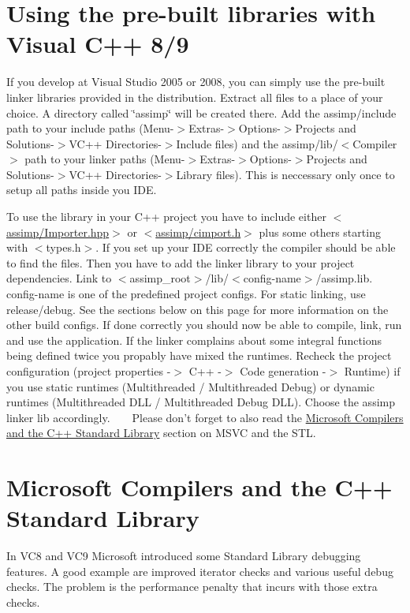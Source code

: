 \hypertarget{install_install_prebuilt}{}\section{Using the pre-\/built libraries with Visual C++ 8/9}\label{install_install_prebuilt}
If you develop at Visual Studio 2005 or 2008, you can simply use the pre-\/built linker libraries provided in the distribution. Extract all files to a place of your choice. A directory called \char`\"{}assimp\char`\"{} will be created there. Add the assimp/include path to your include paths (Menu-\/$>$Extras-\/$>$Options-\/$>$Projects and Solutions-\/$>$V\+C++ Directories-\/$>$Include files) and the assimp/lib/$<$Compiler$>$ path to your linker paths (Menu-\/$>$Extras-\/$>$Options-\/$>$Projects and Solutions-\/$>$V\+C++ Directories-\/$>$Library files). This is neccessary only once to setup all paths inside you I\+D\+E.

To use the library in your C++ project you have to include either $<$\hyperlink{_importer_8hpp_source}{assimp/\+Importer.\+hpp}$>$ or $<$\hyperlink{cimport_8h_source}{assimp/cimport.\+h}$>$ plus some others starting with $<$types.\+h$>$. If you set up your I\+D\+E correctly the compiler should be able to find the files. Then you have to add the linker library to your project dependencies. Link to $<$assimp\+\_\+root$>$/lib/$<$config-\/name$>$/assimp.lib. config-\/name is one of the predefined project configs. For static linking, use release/debug. See the sections below on this page for more information on the other build configs. If done correctly you should now be able to compile, link, run and use the application. If the linker complains about some integral functions being defined twice you propably have mixed the runtimes. Recheck the project configuration (project properties -\/$>$ C++ -\/$>$ Code generation -\/$>$ Runtime) if you use static runtimes (Multithreaded / Multithreaded Debug) or dynamic runtimes (Multithreaded D\+L\+L / Multithreaded Debug D\+L\+L). Choose the assimp linker lib accordingly. ~\newline
~\newline
 Please don't forget to also read the \hyperlink{install_assimp_stl}{Microsoft Compilers and the C++ Standard Library} section on M\+S\+V\+C and the S\+T\+L.\hypertarget{install_assimp_stl}{}\section{Microsoft Compilers and the C++ Standard Library}\label{install_assimp_stl}
In V\+C8 and V\+C9 Microsoft introduced some Standard Library debugging features. A good example are improved iterator checks and various useful debug checks. The problem is the performance penalty that incurs with those extra checks.

